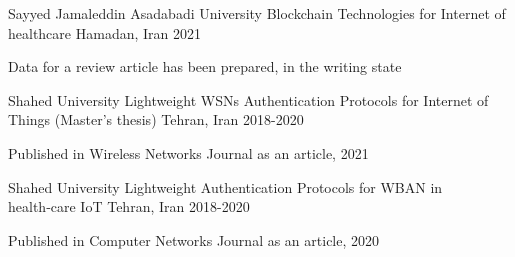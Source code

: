 
\begin{cventries}

  \cventry
  {Sayyed Jamaleddin Asadabadi University} 
  {Blockchain Technologies for Internet of healthcare}
  {Hamadan, Iran} 
  {2021} 
  {
    \begin{cvitems} 
      \item {Data for a review article has been prepared, in the writing state}
    \end{cvitems}
  }


  \cventry
  {Shahed University} 
  {Lightweight WSNs Authentication Protocols for Internet of Things (Master’s thesis)}
  {Tehran, Iran} 
  {2018-2020} 
  {
    \begin{cvitems} 
      \item {Published in Wireless Networks Journal as an article, 2021}
    \end{cvitems}
  }

  \cventry
  {Shahed University} 
  {Lightweight Authentication Protocols for WBAN in health‑care IoT}
  {Tehran, Iran} 
  {2018-2020} 
  {
    \begin{cvitems} 
      \item {Published in Computer Networks Journal as an article, 2020}
    \end{cvitems}
  }


\end{cventries}

